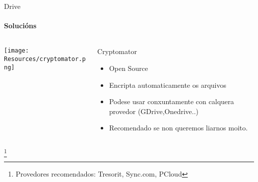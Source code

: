 \documentclass{beamer}
\begin{document}
\begin{frame}{Drive}
  \framesubtitle{Solucións}

  \begin{columns}
    \begin{column}{0.5\textwidth}
      \texttt{[image: Resources/cryptomator.png]}

      \vspace{1cm}


    \end{column}

    \begin{column}{0.4\textwidth}
      \begin{block}{Cryptomator}
        \begin{itemize}
          \item Open Source
          \item Encripta automaticamente os arquivos
          \item Podese usar conxuntamente con calquera provedor (GDrive,Onedrive..)
          \item Recomendado se non queremos liarnos moito.
        \end{itemize}
      \end{block}

    \end{column}

  \end{columns}


  \footnote{Provedores recomendados: Tresorit, Sync.com, PCloud}


\end{frame}

\end{document}

